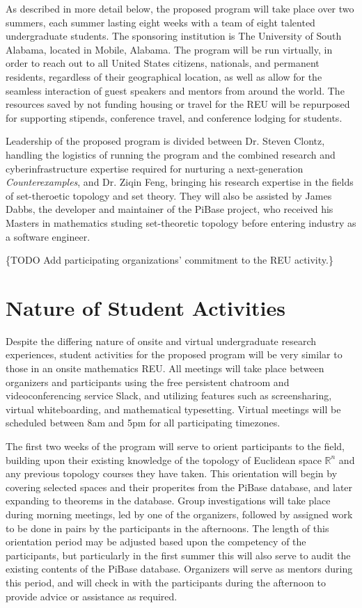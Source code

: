   As described in more detail below, the proposed program will take place
  over two summers, each summer lasting eight weeks
  with a team of eight talented undergraduate
  students. The sponsoring institution is The University of South
  Alabama, located in Mobile, Alabama. The program will be run virtually,
  in order to reach out to all United States citizens, nationals, and
  permanent residents, regardless of their geographical location,
  as well as allow for the seamless interaction of guest speakers and mentors
  from around the world. The resources saved by not funding housing or
  travel for the REU will be repurposed for supporting stipends,
  conference travel, and conference lodging for students.

  Leadership of the proposed program is divided between Dr. Steven Clontz,
  handling the logistics of running the program and the combined
  research and cyberinfrastructure
  expertise required for nurturing a next-generation \textit{Counterexamples},
  and Dr. Ziqin Feng, bringing his research expertise in the fields of set-theroetic
  topology and set theory. They will also be assisted by James Dabbs, the
  developer and maintainer of the PiBase project, who received his Masters
  in mathematics studing set-theoretic topology before entering industry as
  a software engineer.

  \{TODO Add participating organizations'
  commitment to the REU activity.\}

\section{Nature of Student Activities}

  Despite the differing nature of onsite and virtual undergraduate research
  experiences, student activities for the proposed program will be very similar
  to those in an onsite mathematics REU. All meetings will take place
  between organizers and participants using the free persistent chatroom
  and videoconferencing service Slack, and utilizing features such as
  screensharing, virtual whiteboarding, and mathematical typesetting.
  Virtual meetings will be scheduled between 8am and 5pm for all
  participating timezones.

  The first two weeks of the program will serve to orient participants
  to the field, building upon their existing knowledge of the topology of
  Euclidean space \(\mathbb R^n\) and any previous topology courses they
  have taken. This orientation will begin by covering selected
  spaces and their properites from the PiBase database,
  and later expanding to theorems in the database. Group investigations will
  take place during morning meetings, led by one of the organizers, followed
  by assigned work to be done in pairs by the participants in the afternoons.
  The length of this orientation period may be adjusted based upon the
  competency of the participants, but particularly in the first summer this
  will also serve to audit the existing contents of the PiBase database.
  Organizers will serve as mentors during this period, and will check in
  with the participants during the afternoon to provide advice or assistance
  as required.

